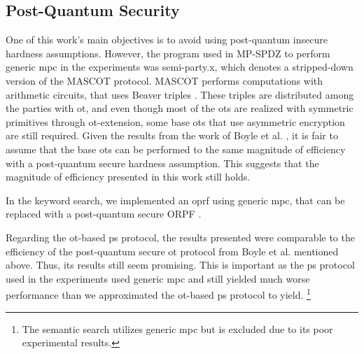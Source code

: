 \subsection*{\thesubsection\quad Post-Quantum Security}\label{subsec:DiscussionPostQuantumSecurity}

One of this work's main objectives is to avoid using post-quantum insecure hardness assumptions. However, the program used in MP-SPDZ to perform generic \acrshort{mpc} in the experiments was semi-party.x, which denotes a stripped-down version of the MASCOT \cite{CCS:KelOrsSch16} protocol. MASCOT performs computations with arithmetic circuits, that uses Beaver triples \cite{C:Beaver91b}. These triples are distributed among the parties with \acrshort{ot}, and even though most of the \acrshort{ot}s are realized with symmetric primitives through \acrshort{ot}-extension, some base \acrshort{ot}s that use asymmetric encryption are still required. Given the results from the work of Boyle et al. \cite{CCS:BCGIKRS19}, it is fair to assume that the base \acrshort{ot}s can be performed to the same magnitude of efficiency with a post-quantum secure hardness assumption. This suggests that the magnitude of efficiency presented in this work still holds. 

In the keyword search, we implemented an \acrshort{oprf} using generic \acrshort{mpc}, that can be replaced with a post-quantum secure ORPF \cite{PKC:ADDS21}. 

Regarding the \acrshort{ot}-based \acrshort{ps} protocol, the results presented were comparable to the efficiency of the post-quantum secure \acrshort{ot} protocol from Boyle et al. mentioned above. Thus, its results still seem promising. This is important as the \acrshort{ps} protocol used in the experiments used generic \acrshort{mpc} and still yielded much worse performance than we approximated the \acrshort{ot}-based \acrshort{ps} protocol to yield. \footnote{The semantic search utilizes generic \acrshort{mpc} but is excluded due to its poor experimental results.}